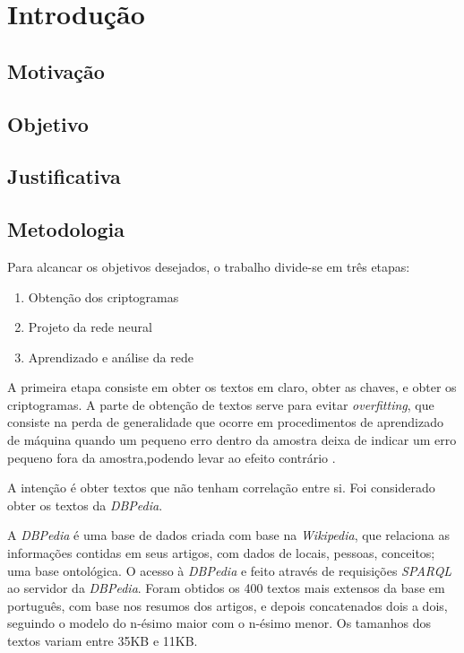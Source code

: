 \chapter{Introdução}

\section{Motivação}

\section{Objetivo}

\section{Justificativa}

\section{Metodologia}

Para alcancar os objetivos desejados, o trabalho divide-se em três etapas:
\begin{enumerate}
\item Obtenção dos criptogramas
\item Projeto da rede neural
\item Aprendizado e análise da rede
\end{enumerate}

A primeira etapa consiste em obter os textos em claro, obter as chaves, e obter os criptogramas. A parte de obtenção de textos serve para evitar \emph{overfitting}, que consiste na perda de generalidade que ocorre em procedimentos de aprendizado de máquina quando um pequeno erro dentro da amostra deixa de indicar um erro pequeno fora da amostra,podendo levar ao efeito contrário \cite{mostafa2012learning}.

A intenção é obter textos que não tenham correlação entre si. Foi considerado obter os textos da \emph{DBPedia}.

A \emph{DBPedia} é uma base de dados criada com base na \emph{Wikipedia}, que relaciona as informações contidas em seus artigos, com dados de locais, pessoas, conceitos; uma base ontológica. O acesso à \emph{DBPedia} e feito através de requisições \emph{SPARQL} ao servidor da \emph{DBPedia}.
Foram obtidos os 400 textos mais extensos da base em português, com base nos resumos dos artigos, e depois concatenados dois a dois, seguindo o modelo do n-ésimo maior com o n-ésimo menor. Os tamanhos dos textos variam entre 35KB e 11KB.

